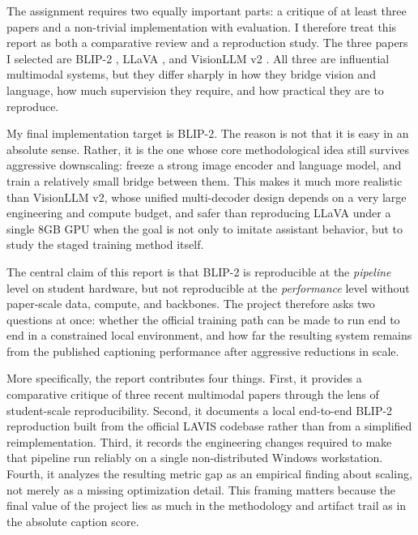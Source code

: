 \documentclass[11pt]{article}
\begin{document}
The assignment requires two equally important parts: a critique of at least three papers and a non-trivial implementation with evaluation. I therefore treat this report as both a comparative review and a reproduction study. The three papers I selected are BLIP-2 \citep{li2023blip2}, LLaVA \citep{liu2023visual}, and VisionLLM v2 \citep{wu2024visionllmv2}. All three are influential multimodal systems, but they differ sharply in how they bridge vision and language, how much supervision they require, and how practical they are to reproduce.

My final implementation target is BLIP-2. The reason is not that it is easy in an absolute sense. Rather, it is the one whose core methodological idea still survives aggressive downscaling: freeze a strong image encoder and language model, and train a relatively small bridge between them. This makes it much more realistic than VisionLLM v2, whose unified multi-decoder design depends on a very large engineering and compute budget, and safer than reproducing LLaVA under a single 8GB GPU when the goal is not only to imitate assistant behavior, but to study the staged training method itself.

The central claim of this report is that BLIP-2 is reproducible at the \emph{pipeline} level on student hardware, but not reproducible at the \emph{performance} level without paper-scale data, compute, and backbones. The project therefore asks two questions at once: whether the official training path can be made to run end to end in a constrained local environment, and how far the resulting system remains from the published captioning performance after aggressive reductions in scale.

More specifically, the report contributes four things. First, it provides a comparative critique of three recent multimodal papers through the lens of student-scale reproducibility. Second, it documents a local end-to-end BLIP-2 reproduction built from the official LAVIS codebase rather than from a simplified reimplementation. Third, it records the engineering changes required to make that pipeline run reliably on a single non-distributed Windows workstation. Fourth, it analyzes the resulting metric gap as an empirical finding about scaling, not merely as a missing optimization detail. This framing matters because the final value of the project lies as much in the methodology and artifact trail as in the absolute caption score.
\end{document}
